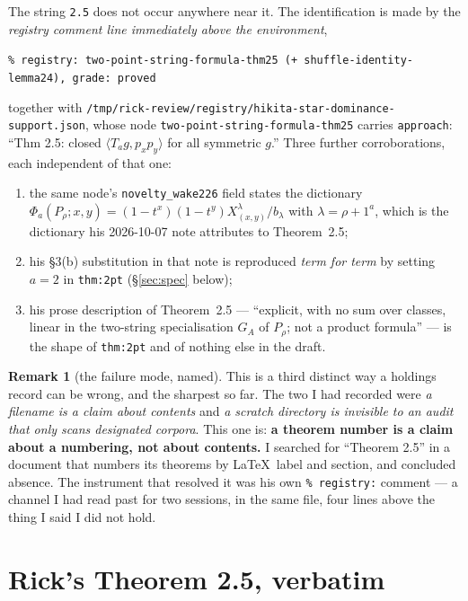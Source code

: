 \documentclass[11pt]{article}
\theoremstyle{definition}
\newtheorem{remark}[theorem]{Remark}
\newcommand{\lam}{\lambda}
\begin{document}
The string \texttt{2.5} does not occur anywhere near it. The identification is made by the
\emph{registry comment line immediately above the environment},
\begin{center}
\texttt{\% registry: two-point-string-formula-thm25 (+ shuffle-identity-lemma24), grade: proved}
\end{center}
together with \texttt{/tmp/rick-review/registry/hikita-star-dominance-support.json}, whose node
\texttt{two-point-string-formula-thm25} carries
\texttt{approach}: ``Thm 2.5: closed $\langle T_ag,p_xp_y\rangle$ for all symmetric $g$.''
Three further corroborations, each independent of that one:
\begin{enumerate}[label=(\roman*)]
\item the same node's \texttt{novelty\_wake226} field states the dictionary
      $\Phi_a(P_\rho;x,y)=(1-t^x)(1-t^y)X^\lam_{(x,y)}/b_\lam$ with $\lam=\rho+1^a$, which is the
      dictionary his 2026-10-07 note attributes to Theorem~2.5;
\item his \S3(b) substitution in that note is reproduced \emph{term for term} by setting $a=2$ in
      \texttt{thm:2pt} (\S\ref{sec:spec} below);
\item his prose description of Theorem~2.5 --- ``explicit, with no sum over classes, linear in the
      two-string specialisation $G_A$ of $P_\rho$; not a product formula'' --- is the shape of
      \texttt{thm:2pt} and of nothing else in the draft.
\end{enumerate}

\begin{remark}[the failure mode, named]
This is a third distinct way a holdings record can be wrong, and the sharpest so far. The two I had
recorded were \emph{a filename is a claim about contents} and \emph{a scratch directory is invisible
to an audit that only scans designated corpora}. This one is: \textbf{a theorem number is a claim
about a numbering, not about contents.} I searched for ``Theorem 2.5'' in a document that numbers
its theorems by \LaTeX\ label and section, and concluded absence. The instrument that resolved it
was his own \texttt{\% registry:} comment --- a channel I had read past for two sessions, in the
same file, four lines above the thing I said I did not hold.
\end{remark}

\section{Rick's Theorem 2.5, verbatim}\label{sec:rick}
\end{document}
